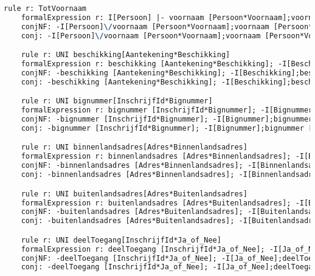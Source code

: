 \begin{lstlisting}[language=TeX]
    rule r: TotVoornaam
    formalExpression r: I[Persoon] |- voornaam [Persoon*Voornaam];voornaam [Persoon*Voornaam]~
    conjNF: -I[Persoon]\/voornaam [Persoon*Voornaam];voornaam [Persoon*Voornaam]~
    conj: -I[Persoon]\/voornaam [Persoon*Voornaam];voornaam [Persoon*Voornaam]~

    rule r: UNI beschikking[Aantekening*Beschikking]
    formalExpression r: beschikking [Aantekening*Beschikking]; -I[Beschikking];beschikking [Aantekening*Beschikking]~ |- -I[Aantekening]
    conjNF: -beschikking [Aantekening*Beschikking]; -I[Beschikking];beschikking [Aantekening*Beschikking]~\/ -I[Aantekening]
    conj: -beschikking [Aantekening*Beschikking]; -I[Beschikking];beschikking [Aantekening*Beschikking]~\/ -I[Aantekening]

    rule r: UNI bignummer[InschrijfId*Bignummer]
    formalExpression r: bignummer [InschrijfId*Bignummer]; -I[Bignummer];bignummer [InschrijfId*Bignummer]~ |- -I[InschrijfId]
    conjNF: -bignummer [InschrijfId*Bignummer]; -I[Bignummer];bignummer [InschrijfId*Bignummer]~\/ -I[InschrijfId]
    conj: -bignummer [InschrijfId*Bignummer]; -I[Bignummer];bignummer [InschrijfId*Bignummer]~\/ -I[InschrijfId]

    rule r: UNI binnenlandsadres[Adres*Binnenlandsadres]
    formalExpression r: binnenlandsadres [Adres*Binnenlandsadres]; -I[Binnenlandsadres];binnenlandsadres [Adres*Binnenlandsadres]~ |- -I[Adres]
    conjNF: -binnenlandsadres [Adres*Binnenlandsadres]; -I[Binnenlandsadres];binnenlandsadres [Adres*Binnenlandsadres]~\/ -I[Adres]
    conj: -binnenlandsadres [Adres*Binnenlandsadres]; -I[Binnenlandsadres];binnenlandsadres [Adres*Binnenlandsadres]~\/ -I[Adres]

    rule r: UNI buitenlandsadres[Adres*Buitenlandsadres]
    formalExpression r: buitenlandsadres [Adres*Buitenlandsadres]; -I[Buitenlandsadres];buitenlandsadres [Adres*Buitenlandsadres]~ |- -I[Adres]
    conjNF: -buitenlandsadres [Adres*Buitenlandsadres]; -I[Buitenlandsadres];buitenlandsadres [Adres*Buitenlandsadres]~\/ -I[Adres]
    conj: -buitenlandsadres [Adres*Buitenlandsadres]; -I[Buitenlandsadres];buitenlandsadres [Adres*Buitenlandsadres]~\/ -I[Adres]

    rule r: UNI deelToegang[InschrijfId*Ja_of_Nee]
    formalExpression r: deelToegang [InschrijfId*Ja_of_Nee]; -I[Ja_of_Nee];deelToegang [InschrijfId*Ja_of_Nee]~ |- -I[InschrijfId]
    conjNF: -deelToegang [InschrijfId*Ja_of_Nee]; -I[Ja_of_Nee];deelToegang [InschrijfId*Ja_of_Nee]~\/ -I[InschrijfId]
    conj: -deelToegang [InschrijfId*Ja_of_Nee]; -I[Ja_of_Nee];deelToegang [InschrijfId*Ja_of_Nee]~\/ -I[InschrijfId]


\end{lstlisting}
